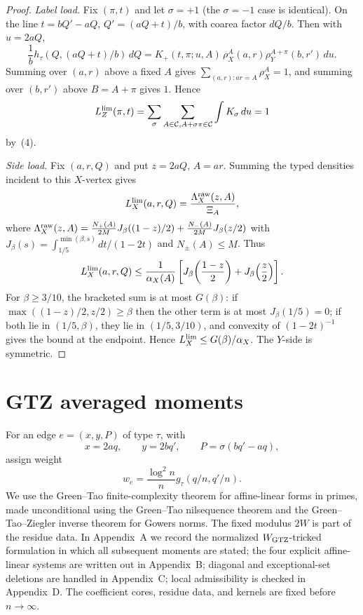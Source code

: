 \documentclass[11pt]{article}
\newcommand{\C}{\mathcal C}
\begin{document}
\begin{proof}
\emph{Label load.}  Fix \((\pi,t)\) and let \(\sigma=+1\) (the
\(\sigma=-1\) case is identical).  On the line \(t=bQ'-aQ\),
\(Q'=(aQ+t)/b\), with coarea factor \(dQ/b\).  Then with \(u=2aQ\),
\[
  \frac1bh_\tau(Q,(aQ+t)/b)\,dQ
  =K_+(t,\pi;u,A)\,\rho_X^A(a,r)\rho_Y^{A+\pi}(b,r')\,du.
\]
Summing over \((a,r)\) above a fixed \(A\) gives \(\sum_{(a,r):ar=A}\rho_X^A=1\),
and summing over \((b,r')\) above \(B=A+\pi\) gives \(1\).  Hence
\[
  L_Z^{\rm lim}(\pi,t)
  =\sum_{\sigma}\sum_{A\in\C,A+\sigma\pi\in\C}\int K_\sigma\,du
  =1
\]
by~(4).

\emph{Side load.}  Fix \((a,r,Q)\) and put \(z=2aQ\), \(A=ar\).  Summing the
typed densities incident to this \(X\)-vertex gives
\[
  L_X^{\rm lim}(a,r,Q)=\frac{\Lambda_X^{\rm raw}(z,A)}{\Xi_A},
\]
where
\(
  \Lambda_X^{\rm raw}(z,A)
  =\frac{N_+(A)}{2M}J_\beta((1-z)/2)+\frac{N_-(A)}{2M}J_\beta(z/2)
\)
with \(J_\beta(s)=\int_{1/5}^{\min(\beta,s)}dt/(1-2t)\) and
\(N_\pm(A)\le M\).  Thus
\[
  L_X^{\rm lim}(a,r,Q)
  \le\frac{1}{\alpha_X(A)}
  \left[J_\beta\!\left(\frac{1-z}{2}\right)+J_\beta\!\left(\frac{z}{2}\right)\right].
\]
For \(\beta\ge3/10\), the bracketed sum is at most \(G(\beta)\): if
\(\max((1-z)/2,z/2)\ge\beta\) then the other term is at most
\(J_\beta(1/5)=0\); if both lie in \((1/5,\beta)\), they lie in
\((1/5,3/10)\), and convexity of \((1-2t)^{-1}\) gives the bound at the
endpoint.  Hence \(L_X^{\rm lim}\le G(\beta)/\alpha_X\).  The \(Y\)-side is
symmetric.
\end{proof}

\section{GTZ averaged moments}

For an edge \(e=(x,y,P)\) of type \(\tau\), with
\[
  x=2aq,\qquad y=2bq',\qquad P=\sigma(bq'-aq),
\]
assign weight
\[
  w_e=\frac{\log^2 n}{n}g_\tau(q/n,q'/n).
\]
We use the Green--Tao finite-complexity theorem for affine-linear forms in
primes, made unconditional using the Green--Tao nilsequence theorem and the
Green--Tao--Ziegler inverse theorem for Gowers norms.  The fixed modulus
\(2W\) is part of the residue data.  In Appendix~A we record the normalized
\(W_{\rm GTZ}\)-tricked formulation in which all subsequent moments are
stated; the four explicit affine-linear systems are written out in
Appendix~B; diagonal and exceptional-set deletions are handled in
Appendix~C; local admissibility is checked in Appendix~D.  The coefficient
cores, residue data, and kernels are fixed before \(n\to\infty\).
\end{document}
